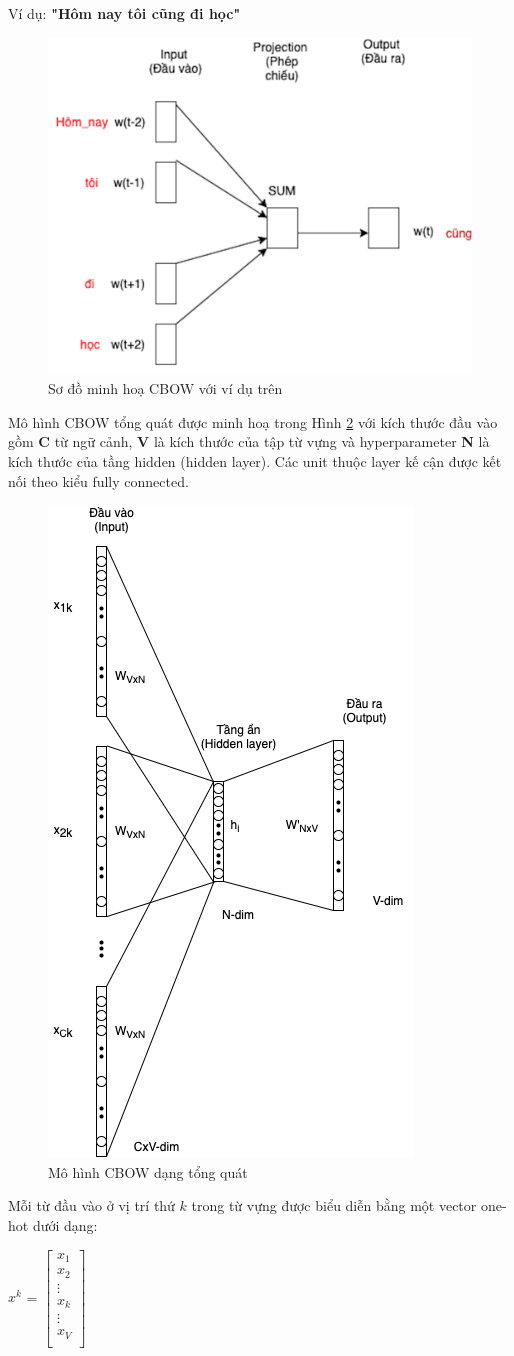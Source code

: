 Ví dụ: \textbf{"Hôm nay tôi cũng đi học"}
\begin{figure}[!htb]
	\centering
		\includegraphics[width=0.5\columnwidth]{chapter04/figure/cbow_3.png}
        \caption{Sơ đồ minh hoạ CBOW với ví dụ trên}
        \label{fig:cbow2}
\end{figure}

Mô hình CBOW tổng quát được minh hoạ trong Hình \ref{fig:cbow3} với kích thước đầu vào gồm \textbf{C} từ ngữ cảnh, \textbf{V} là kích thước của tập từ vựng và hyperparameter \textbf{N} là kích thước của tầng hidden (hidden layer). Các unit thuộc layer kế cận được kết nối theo kiểu fully connected.
\clearpage
\begin{figure}[!h]
    \centering
    \includegraphics[width=0.5\columnwidth]{chapter04/figure/cbow_4.png}
    \caption{Mô hình CBOW dạng tổng quát}
    \label{fig:cbow3}
\end{figure}

Mỗi từ đầu vào ở vị trí thứ $k$ trong từ vựng được biểu diễn bằng một vector one-hot dưới dạng:
\begin{center}
    $x^{k}$ =
    $\begin{bmatrix}
        x_{1}\\
        x_{2} \\
        \vdots \\
        x_{k} \\
        \vdots \\
        x_{V} \\
    \end{bmatrix}$
\end{center}

